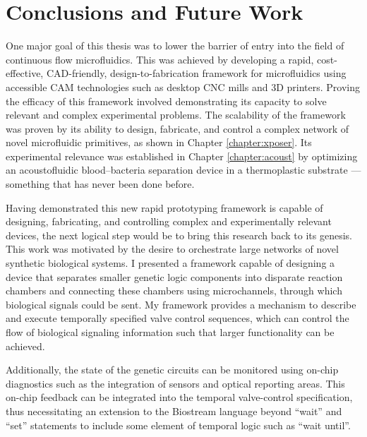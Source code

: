 \chapter{Conclusions and Future Work}
\label{chapter:Conclusions}
\thispagestyle{myheadings}

\graphicspath{{3_Conclusion/Figures/}}

One major goal of this thesis was to lower the barrier of entry into the field of continuous flow microfluidics. This was achieved by developing a rapid, cost-effective, CAD-friendly, design-to-fabrication framework for microfluidics using accessible CAM technologies such as desktop CNC mills and 3D printers. Proving the efficacy of this framework involved demonstrating its capacity to solve relevant and complex experimental problems. The scalability of the framework was proven by its ability to design, fabricate, and control a complex network of novel microfluidic primitives, as shown in Chapter \ref{chapter:xposer}. Its experimental relevance was established in Chapter \ref{chapter:acoust} by optimizing an acoustofluidic blood--bacteria separation device in a thermoplastic substrate --- something that has never been done before.

Having demonstrated this new rapid prototyping framework is capable of designing, fabricating, and controlling complex and experimentally relevant devices, the next logical step would be to bring this research back to its genesis. This work was motivated by the desire to orchestrate large networks of novel synthetic biological systems. I presented a framework capable of designing a device that separates smaller genetic logic components into disparate reaction chambers and connecting these chambers using microchannels, through which biological signals could be sent. My framework provides a mechanism to describe and execute temporally specified valve control sequences, which can control the flow of biological signaling information such that larger functionality can be achieved. 

Additionally, the state of the genetic circuits can be monitored using on-chip diagnostics such as the integration of sensors and optical reporting areas. This on-chip feedback can be integrated into the temporal valve-control specification, thus necessitating an extension to the Biostream language beyond ``wait'' and ``set'' statements to include some element of temporal logic such as ``wait until''.

